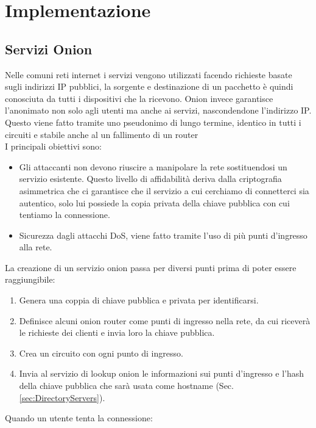 \chapter{Implementazione}

\section{Servizi Onion}
Nelle comuni reti internet i servizi vengono utilizzati facendo richieste basate sugli indirizzi IP pubblici, la sorgente e destinazione di un pacchetto è quindi conosciuta da tutti i dispositivi che la ricevono. 
Onion invece garantisce l'anonimato non solo agli utenti ma anche ai servizi, nascondendone l'indirizzo IP. 
Questo viene fatto tramite uno pseudonimo di lungo termine, identico in tutti i circuiti e stabile anche al un fallimento di un router \\
I principali obiettivi sono:
\begin{itemize}
    \item Gli attaccanti non devono riuscire a manipolare la rete sostituendosi un servizio esistente. Questo livello di affidabilità deriva dalla criptografia asimmetrica che ci garantisce che il servizio a cui cerchiamo di connetterci sia autentico, solo lui possiede la copia privata della chiave pubblica con cui tentiamo la connessione.
    \item Sicurezza dagli attacchi DoS, viene fatto tramite l'uso di più punti d'ingresso alla rete.
\end{itemize}
La creazione di un servizio onion passa per diversi punti prima di poter essere raggiungibile:
\begin{enumerate}
    \item Genera una coppia di chiave pubblica e privata per identificarsi.
    \item Definisce alcuni onion router come punti di ingresso nella rete, da cui riceverà le richieste dei clienti e invia loro la chiave pubblica.
    \item Crea un circuito con ogni punto di ingresso.
    \item Invia al servizio di lookup onion le informazioni sui punti d'ingresso e l'hash della chiave pubblica che sarà usata come hostname (Sec. \ref{sec:DirectoryServers}).
\end{enumerate}
Quando un utente tenta la connessione:
